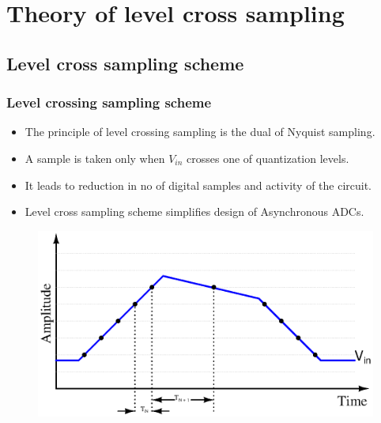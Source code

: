 \documentclass{beamer}
\begin{document}
\section{Theory of level cross sampling}
\subsection*{Level cross sampling scheme}
\begin{frame}
	\frametitle{Level crossing sampling scheme} \footnotesize
	\begin{itemize}
		\item{The principle of level crossing sampling is the dual of Nyquist sampling.}		
		\item{A sample is taken only when $V_{in}$ crosses one of quantization levels.}\\
		\item{It leads to reduction in no of digital samples and activity of the circuit.}\\
		\item{Level cross sampling scheme simplifies design of Asynchronous ADCs.}\\			
        \end{itemize}
	\begin{center}
		\begin{figure}
			\includegraphics[width=7 cm,height=3.5 cm,angle=360]{Figures/04LCSScheme.ps}\\
		\end{figure}
		\scriptsize{ \color{blue}{Level Cross Sampling Scheme}}
	\end{center}
\end{frame}
\end{document}
